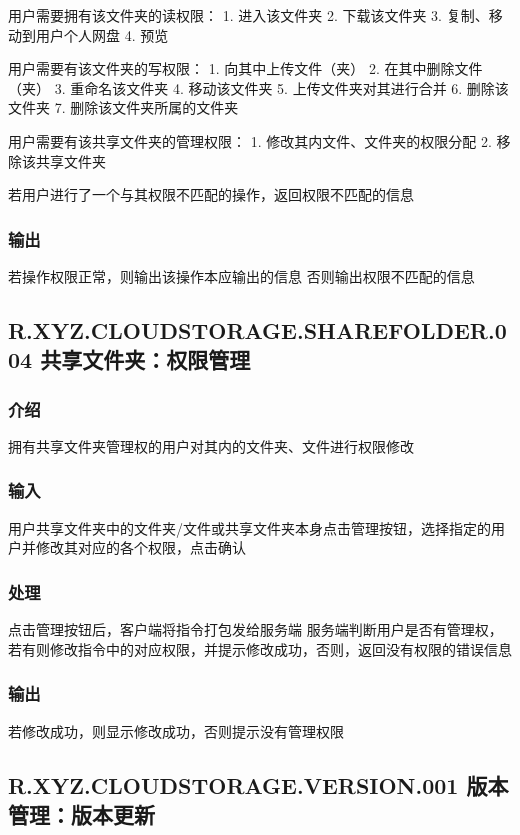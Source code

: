 用户需要拥有该文件夹的读权限：
1. 进入该文件夹
2. 下载该文件夹
3. 复制、移动到用户个人网盘
4. 预览

用户需要有该文件夹的写权限：
1. 向其中上传文件（夹）
2. 在其中删除文件（夹）
3. 重命名该文件夹
4. 移动该文件夹
5. 上传文件夹对其进行合并
6. 删除该文件夹
7. 删除该文件夹所属的文件夹

用户需要有该共享文件夹的管理权限：
1. 修改其内文件、文件夹的权限分配
2. 移除该共享文件夹

若用户进行了一个与其权限不匹配的操作，返回权限不匹配的信息

\subsubsection{输出} 
若操作权限正常，则输出该操作本应输出的信息
否则输出权限不匹配的信息


\subsection{R.XYZ.CLOUDSTORAGE.SHAREFOLDER.004 共享文件夹：权限管理}

\subsubsection{介绍}
拥有共享文件夹管理权的用户对其内的文件夹、文件进行权限修改

\subsubsection{输入} 
用户共享文件夹中的文件夹/文件或共享文件夹本身点击管理按钮，选择指定的用户并修改其对应的各个权限，点击确认

\subsubsection{处理} 
点击管理按钮后，客户端将指令打包发给服务端
服务端判断用户是否有管理权，若有则修改指令中的对应权限，并提示修改成功，否则，返回没有权限的错误信息

\subsubsection{输出} 
若修改成功，则显示修改成功，否则提示没有管理权限

\subsection{R.XYZ.CLOUDSTORAGE.VERSION.001 版本管理：版本更新}

